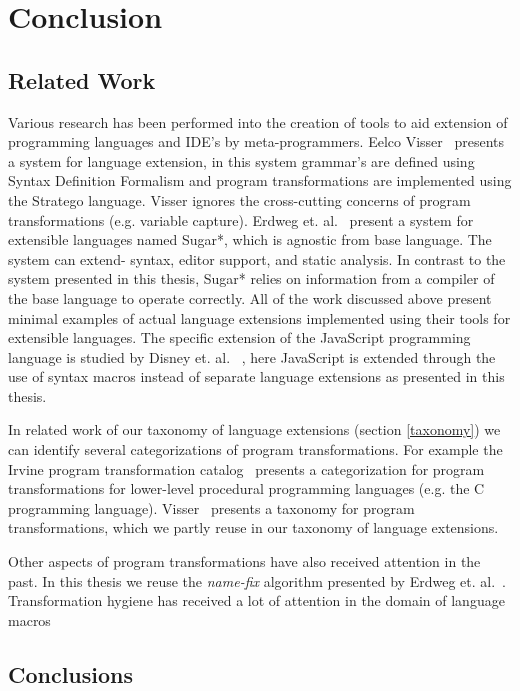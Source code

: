 
\chapter{Conclusion} %

\label{Chapter5} %


\section{Related Work}
Various research has been performed into the creation of tools to aid extension of programming languages and IDE's by meta-programmers. Eelco Visser~\cite{Visser20024} presents a system for language extension, in this system grammar's are defined using Syntax Definition Formalism and program transformations are implemented using the Stratego language. Visser ignores the cross-cutting concerns of program transformations (e.g. variable capture). Erdweg et. al.~\cite{Erdweg} present a system for extensible languages named Sugar*, which is agnostic from base language. The system can extend- syntax, editor support, and static analysis. In contrast to the system presented in this thesis, Sugar* relies on information from a compiler of the base language to operate correctly.  
All of the work discussed above present minimal examples of actual language extensions implemented using their tools for extensible languages. The specific extension of the JavaScript programming language is studied by Disney et. al. ~\cite{Disney2014}, here JavaScript is extended through the use of syntax macros instead of separate language extensions as presented in this thesis.

In related work of our taxonomy of language extensions (section \ref{taxonomy}) we can identify several categorizations of program transformations. For example the Irvine program transformation catalog~\cite{Standish1976a} presents a categorization for program transformations for lower-level procedural programming languages (e.g. the C programming language). Visser~\cite{Visser2001} presents a taxonomy for program transformations, which we partly reuse in our taxonomy of language extensions. 

Other aspects of program transformations have also received attention in the past. In this thesis we reuse the \textit{name-fix} algorithm presented by Erdweg et. al.~\cite{Erdweg2014}. Transformation hygiene has received a lot of attention in the domain of language macros~\cite{Kohlbecker1986,Herman2010a,Disney2014}

\section{Conclusions}
